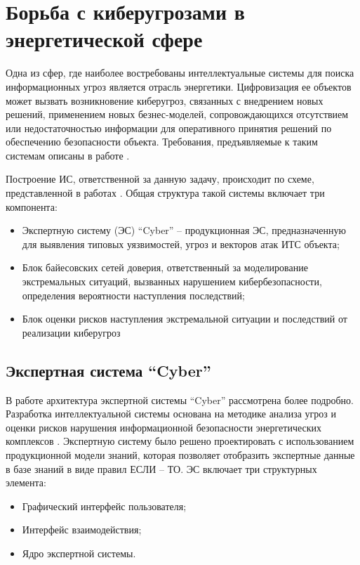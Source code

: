 \newpage
\section{Борьба с киберугрозами в энергетической сфере}
Одна из сфер, где наиболее востребованы интеллектуальные системы для поиска информационных угроз
является отрасль энергетики. Цифровизация ее объектов может вызвать возникновение киберугроз,
связанных с внедрением новых решений, применением новых безнес-моделей, сопровождающихся отсутствием
или недостаточностью информации для оперативного принятия решений по обеспечению безопасности объекта.
Требования, предъявляемые к таким системам описаны в работе \cite{reqs}.

Построение ИС, ответственной за данную задачу, происходит по схеме, представленной
в работах \cite{scheme, ontoling}.
Общая структура такой системы включает три компонента:
\begin{itemize}
\item
Экспертную систему (ЭС) ``Cyber'' -- продукционная ЭС, предназначенную для выявления типовых уязвимостей,
угроз и векторов атак ИТС объекта;
\item
Блок байесовских сетей доверия, ответственный за моделирование экстремальных ситуаций, вызванных нарушением
кибербезопасности, определения вероятности наступления последствий;
\item
Блок оценки рисков наступления экстремальной ситуации и последствий от реализации киберугроз
\end{itemize}

\subsection{Экспертная система ``Cyber''}
В работе \cite{cyber} архитектура экспертной системы ``Cyber'' рассмотрена более подробно.
Разработка интеллектуальной системы основана на методике анализа угроз и оценки рисков нарушения
информационной безопасности энергетических комплексов \cite{methods}.
Экспертную систему было решено проектировать с использованием продукционной модели знаний,
которая позволяет отобразить экспертные данные в базе знаний в виде правил ЕСЛИ – ТО. ЭС
включает три структурных элемента:
\begin{itemize}
\item Графический интерфейс пользователя;
\item Интерфейс взаимодействия;
\item Ядро экспертной системы.
\end{itemize}

